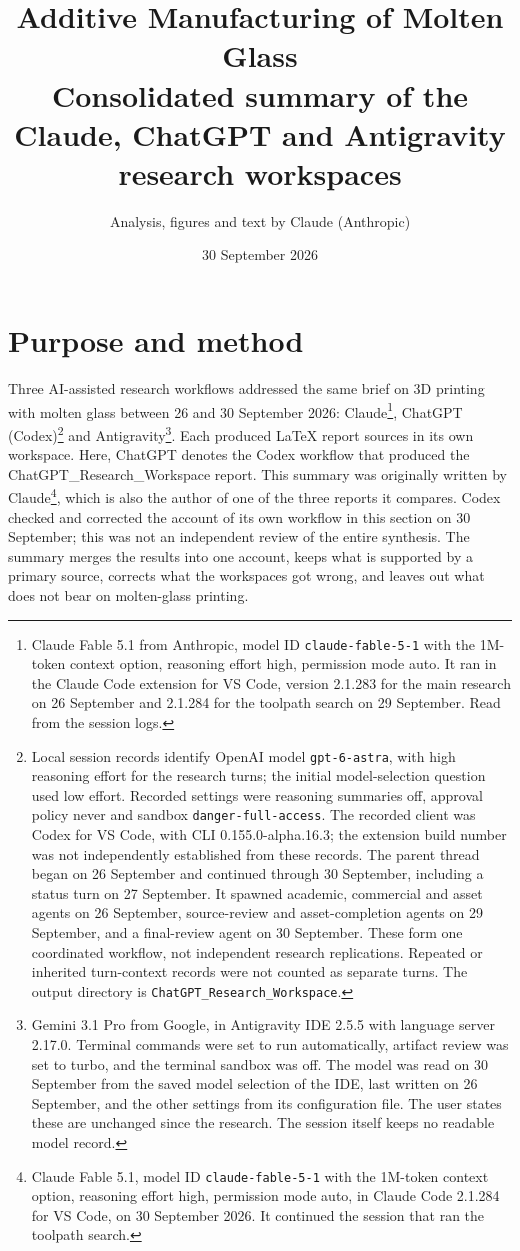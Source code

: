 \documentclass[10pt,a4paper]{article}
\title{\textbf{Additive Manufacturing of Molten Glass}\\[4pt]\large Consolidated summary of the Claude, ChatGPT and Antigravity research workspaces}
\author{\normalsize Analysis, figures and text by Claude (Anthropic)}
\date{30 September 2026}
\begin{document}
\maketitle
\tableofcontents
\bigskip

\section{Purpose and method}

Three AI-assisted research workflows addressed the same brief on 3D printing with molten glass between 26 and 30 September 2026: Claude\footnote{Claude Fable 5.1 from Anthropic, model ID \texttt{claude-fable-5-1} with the 1M-token context option, reasoning effort high, permission mode auto. It ran in the Claude Code extension for VS Code, version 2.1.283 for the main research on 26 September and 2.1.284 for the toolpath search on 29 September. Read from the session logs.}, ChatGPT (Codex)\footnote{Local session records identify OpenAI model \texttt{gpt-6-astra}, with high reasoning effort for the research turns; the initial model-selection question used low effort. Recorded settings were reasoning summaries off, approval policy never and sandbox \texttt{danger-full-access}. The recorded client was Codex for VS Code, with CLI 0.155.0-alpha.16.3; the extension build number was not independently established from these records. The parent thread began on 26 September and continued through 30 September, including a status turn on 27 September. It spawned academic, commercial and asset agents on 26 September, source-review and asset-completion agents on 29 September, and a final-review agent on 30 September. These form one coordinated workflow, not independent research replications. Repeated or inherited turn-context records were not counted as separate turns. The output directory is \texttt{ChatGPT\_Research\_Workspace}.} and Antigravity\footnote{Gemini 3.1 Pro from Google, in Antigravity IDE 2.5.5 with language server 2.17.0. Terminal commands were set to run automatically, artifact review was set to turbo, and the terminal sandbox was off. The model was read on 30 September from the saved model selection of the IDE, last written on 26 September, and the other settings from its configuration file. The user states these are unchanged since the research. The session itself keeps no readable model record.}. Each produced LaTeX report sources in its own workspace. Here, ChatGPT denotes the Codex workflow that produced the ChatGPT\_Research\_Workspace report. This summary was originally written by Claude\footnote{Claude Fable 5.1, model ID \texttt{claude-fable-5-1} with the 1M-token context option, reasoning effort high, permission mode auto, in Claude Code 2.1.284 for VS Code, on 30 September 2026. It continued the session that ran the toolpath search.}, which is also the author of one of the three reports it compares. Codex checked and corrected the account of its own workflow in this section on 30 September; this was not an independent review of the entire synthesis. The summary merges the results into one account, keeps what is supported by a primary source, corrects what the workspaces got wrong, and leaves out what does not bear on molten-glass printing.
\end{document}
